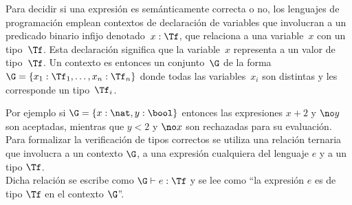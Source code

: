 \documentclass[11pt,letterpaper]{article}
\begin{document}




\espc

Para decidir si una expresión es semánticamente correcta o no, los lenguajes de
programación emplean contextos de declaración de variables que involucran a un 
predicado binario infijo denotado~$x:\Tf$, que relaciona a una variable~$x$ con 
un tipo~$\Tf$. Esta declaración significa que la variable~$x$ representa a un 
valor de tipo~$\Tf$. Un contexto es entonces un conjunto~$\G$ de la forma 
$\G=\{x_1:\Tf_1,\ldots, x_n:\Tf_n\}$ donde todas las variables~$x_i$ son 
distintas y les corresponde un tipo~$\Tf_i$.

Por ejemplo si $\G=\{x:\nat,y:\bool\}$ entonces las expresiones $x+2$
y $\no y$ son aceptadas, mientras que $y<2$ y $\no x$ son rechazadas
para su evaluación. Para formalizar la verificación de tipos correctos
se utiliza una relación ternaria que involucra a un contexto $\G$, a
una expresión cualquiera del lenguaje $e$ y a un tipo $\Tf$. \\
Dicha relación se escribe como $\G\vdash e:\Tf$ y se lee como \enquote{la
expresión $e$ es de tipo $\Tf$ en el contexto $\G$}.
\end{document}
